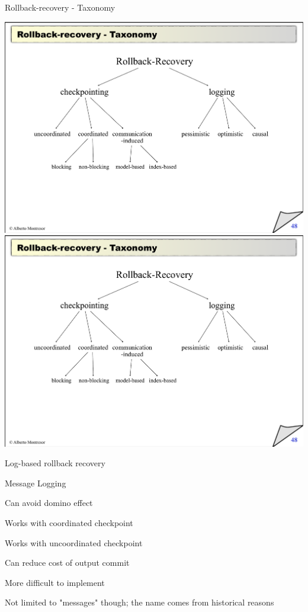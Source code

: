 \begin{frame}{Rollback-recovery - Taxonomy}
\begin{overprint}
\includegraphics[width=\textwidth,page=2]{taxonomy.pdf}
\includegraphics[width=\textwidth,page=3]{taxonomy.pdf}
\end{overprint}
\end{frame}

\begin{frame}{Log-based rollback recovery}

\BI
\item \alert{Message Logging}
	\BI
	\item Can avoid domino effect
	\item Works with coordinated checkpoint
	\item Works with uncoordinated checkpoint
	\item Can reduce cost of output commit
	\item \alert{More difficult to implement}
	\EI
\item Not limited to "messages" though; the name comes from historical reasons
\EI
\end{frame}

